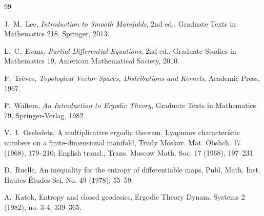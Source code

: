 \documentclass[12pt]{article}
\theoremstyle{definition}
\begin{document}
\begin{thebibliography}{99}

J.~M.~Lee,
\emph{Introduction to Smooth Manifolds},
2nd ed.,
Graduate Texts in Mathematics 218,
Springer,
2013.

L.~C.~Evans,
\emph{Partial Differential Equations},
2nd ed.,
Graduate Studies in Mathematics 19,
American Mathematical Society,
2010.

F.~Tr\`eves,
\emph{Topological Vector Spaces, Distributions and Kernels},
Academic Press,
1967.

P.~Walters,
\emph{An Introduction to Ergodic Theory},
Graduate Texts in Mathematics 79,
Springer-Verlag,
1982.

V.~I.~Oseledets,
A multiplicative ergodic theorem. Lyapunov characteristic numbers on a finite-dimensional manifold,
Trudy Moskov. Mat. Obshch. 17 (1968), 179--210;
English transl., Trans. Moscow Math. Soc. 17 (1968), 197--231.

D.~Ruelle,
An inequality for the entropy of differentiable maps,
Publ. Math. Inst. Hautes \'Etudes Sci. No. 49 (1978), 55--59.

A.~Katok,
Entropy and closed geodesics,
Ergodic Theory Dynam. Systems 2 (1982), no. 3-4, 339--365.

\end{thebibliography}
\end{document}
